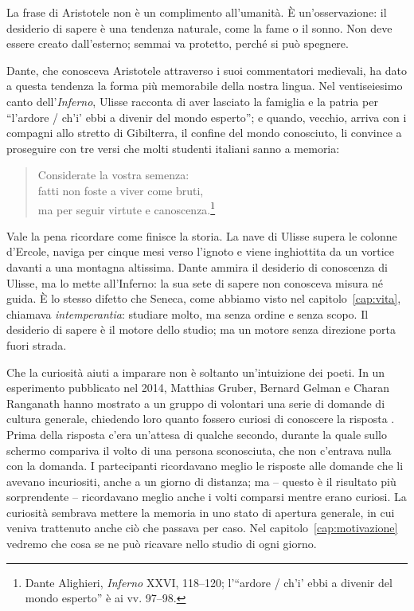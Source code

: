 La frase di Aristotele non è un complimento all'umanità. È
un'osservazione: il desiderio di sapere è una tendenza naturale, come la
fame o il sonno. Non deve essere creato dall'esterno; semmai va
protetto, perché si può spegnere.

Dante, che conosceva Aristotele attraverso i suoi commentatori
medievali, ha dato a questa tendenza la forma più memorabile della
nostra lingua. Nel ventiseiesimo canto dell'\emph{Inferno}, Ulisse
racconta di aver lasciato la famiglia e la patria per \enquote{l'ardore
/ ch'i' ebbi a divenir del mondo esperto}; e quando, vecchio,
arriva con i compagni allo stretto di Gibilterra, il confine del mondo
conosciuto, li convince a proseguire con tre versi che molti studenti
italiani sanno a memoria:
\begin{quote}
Considerate la vostra semenza:\\
fatti non foste a viver come bruti,\\
ma per seguir virtute e canoscenza.\footnote{Dante Alighieri,
\emph{Inferno} XXVI, 118--120; l'\enquote{ardore / ch'i' ebbi a
divenir del mondo esperto} è ai vv. 97--98.}
\end{quote}
Vale la pena ricordare come finisce la storia. La nave di Ulisse supera
le colonne d'Ercole, naviga per cinque mesi verso l'ignoto e viene
inghiottita da un vortice davanti a una montagna altissima. Dante
ammira il desiderio di conoscenza di Ulisse, ma lo mette all'Inferno: la
sua sete di sapere non conosceva misura né guida. È lo stesso difetto
che Seneca, come abbiamo visto nel capitolo~\ref{cap:vita}, chiamava
\emph{intemperantia}: studiare molto, ma senza ordine e senza scopo. Il
desiderio di sapere è il motore dello studio; ma un motore senza
direzione porta fuori strada.

Che la curiosità aiuti a imparare non è soltanto un'intuizione dei
poeti. In un esperimento pubblicato nel 2014, Matthias Gruber, Bernard
Gelman e Charan Ranganath hanno mostrato a un gruppo di volontari una
serie di domande di cultura generale, chiedendo loro quanto fossero
curiosi di conoscere la risposta \parencite{gruber2014}. Prima della
risposta c'era un'attesa di qualche secondo, durante la quale sullo
schermo compariva il volto di una persona sconosciuta, che non c'entrava
nulla con la domanda. I partecipanti ricordavano meglio le risposte alle
domande che li avevano incuriositi, anche a un giorno di distanza; ma --
questo è il risultato più sorprendente -- ricordavano meglio anche i
volti comparsi mentre erano curiosi. La curiosità sembrava mettere la
memoria in uno stato di apertura generale, in cui veniva trattenuto
anche ciò che passava per caso. Nel capitolo~\ref{cap:motivazione}
vedremo che cosa se ne può ricavare nello studio di ogni giorno.

